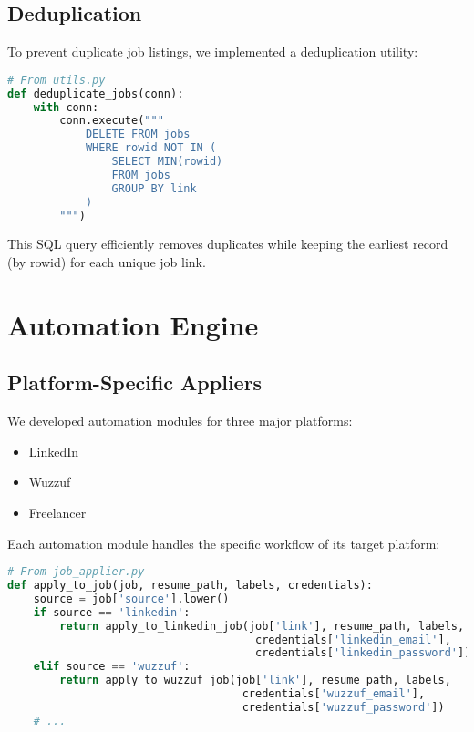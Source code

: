 \documentclass[12pt,a4paper]{report}
\begin{document}
\subsection{Deduplication}
To prevent duplicate job listings, we implemented a deduplication utility:

\begin{lstlisting}[language=Python, caption=Deduplication Implementation]
# From utils.py
def deduplicate_jobs(conn):
    with conn:
        conn.execute("""
            DELETE FROM jobs
            WHERE rowid NOT IN (
                SELECT MIN(rowid)
                FROM jobs
                GROUP BY link
            )
        """)
\end{lstlisting}

This SQL query efficiently removes duplicates while keeping the earliest record (by rowid) for each unique job link.

\section{Automation Engine}

\subsection{Platform-Specific Appliers}
We developed automation modules for three major platforms:
\begin{itemize}
    \item LinkedIn
    \item Wuzzuf
    \item Freelancer
\end{itemize}

Each automation module handles the specific workflow of its target platform:

\begin{lstlisting}[language=Python, caption=Job Application Automation]
# From job_applier.py
def apply_to_job(job, resume_path, labels, credentials):
    source = job['source'].lower()
    if source == 'linkedin':
        return apply_to_linkedin_job(job['link'], resume_path, labels, 
                                      credentials['linkedin_email'], 
                                      credentials['linkedin_password'])
    elif source == 'wuzzuf':
        return apply_to_wuzzuf_job(job['link'], resume_path, labels, 
                                    credentials['wuzzuf_email'], 
                                    credentials['wuzzuf_password'])
    # ...
\end{lstlisting}
\end{document}
